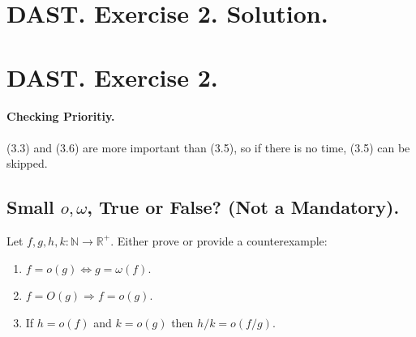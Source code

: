 \fi





%


 



\setcounter{chapter}{2}
\ifdefined\SOLUTION
  \section{DAST. Exercise 2. Solution.}
\else
  \section{DAST. Exercise 2.}
\fi

\ifdefined\CHECK

\paragraph{Checking Prioritiy.} (3.3) and (3.6) are more important than (3.5), so if there is no time, (3.5) can be skipped.


\paragraph{}

\fi



 \subsection{Small $o,\omega$, True or False? (Not a Mandatory). }
 Let $f,g,h,k : \mathbb{N} \rightarrow \mathbb{R}^{+}$. Either prove or provide a counterexample:
\begin{enumerate}
  \item $f = o(g) \Leftrightarrow g = \omega(f)$. 
  \item $f = O(g) \Rightarrow f = o(g)$. 
  \item If $h = o(f)$ and $k = o(g)$ then $h/k = o(f/g)$.  
\end{enumerate}

